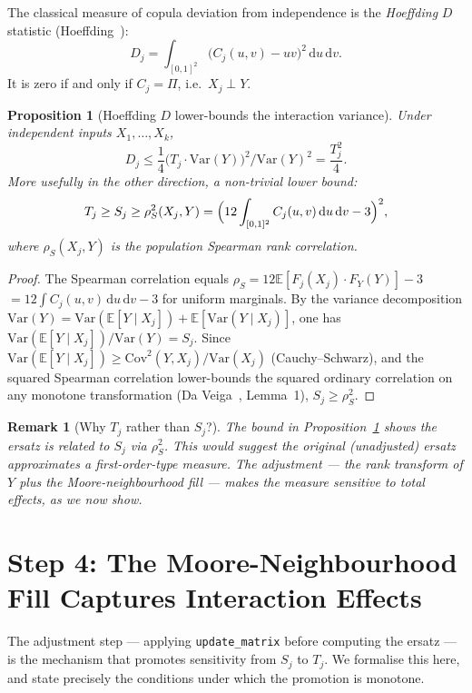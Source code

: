 \documentclass[11pt,a4paper]{article}
\newtheorem{proposition}[theorem]{Proposition}
\newtheorem{remark}[theorem]{Remark}
\theoremstyle{definition}
\newcommand{\E}{\mathbb{E}}
\newcommand{\Var}{\mathrm{Var}}
\newcommand{\Cov}{\mathrm{Cov}}
\begin{document}
The classical measure of copula deviation from independence is the
\emph{Hoeffding} $D$ statistic (Hoeffding~\cite{hoeffding1948}):
\[
  D_j = \int_{[0,1]^2} \bigl(C_j(u,v) - uv\bigr)^2 \,\mathrm{d}u\,\mathrm{d}v.
\]
It is zero if and only if $C_j = \Pi$, i.e.\ $X_j \perp Y$.

\begin{proposition}[Hoeffding $D$ lower-bounds the interaction variance]
\label{prop:hoeffding}
Under independent inputs $X_1,\ldots,X_k$,
\[
  D_j \le \frac{1}{4}\bigl(T_j \cdot \Var(Y)\bigr)^2 / \Var(Y)^2
        = \frac{T_j^2}{4}.
\]
More usefully in the other direction, a non-trivial lower bound:
\[
  T_j \ge S_j \ge \rho_S^2(X_j, Y)
      = \Bigl(12\int_{[0,1]^2} C_j(u,v)\,\mathrm{d}u\,\mathrm{d}v - 3\Bigr)^2,
\]
where $\rho_S(X_j, Y)$ is the population Spearman rank correlation.
\end{proposition}

\begin{proof}
The Spearman correlation equals $\rho_S = 12\E[F_j(X_j)\cdot F_Y(Y)] - 3$
$= 12\int C_j(u,v)\,\mathrm{d}u\,\mathrm{d}v - 3$ for uniform marginals.
By the variance decomposition $\Var(Y) = \Var(\E[Y\mid X_j]) + \E[\Var(Y\mid
X_j)]$, one has $\Var(\E[Y\mid X_j])/\Var(Y) = S_j$.  Since
$\Var(\E[Y\mid X_j]) \ge \Cov^2(Y, X_j)/\Var(X_j)$ (Cauchy–Schwarz), and
the squared Spearman correlation lower-bounds the squared ordinary
correlation on any monotone transformation (Da Veiga~\cite{daveiga2015}, Lemma~1),
$S_j \ge \rho_S^2$.
\end{proof}

\begin{remark}[Why $T_j$ rather than $S_j$?]
The bound in Proposition~\ref{prop:hoeffding} shows the ersatz is related
to $S_j$ via $\rho_S^2$.  This would suggest the original (unadjusted)
ersatz approximates a first-order-type measure.  The adjustment — the rank
transform of $Y$ plus the Moore-neighbourhood fill — makes the measure
sensitive to total effects, as we now show.
\end{remark}

\section{Step 4: The Moore-Neighbourhood Fill Captures Interaction Effects}

The adjustment step — applying \texttt{update\_matrix} before computing
the ersatz — is the mechanism that promotes sensitivity from $S_j$ to $T_j$.
We formalise this here, and state precisely the conditions under which
the promotion is monotone.
\end{document}

